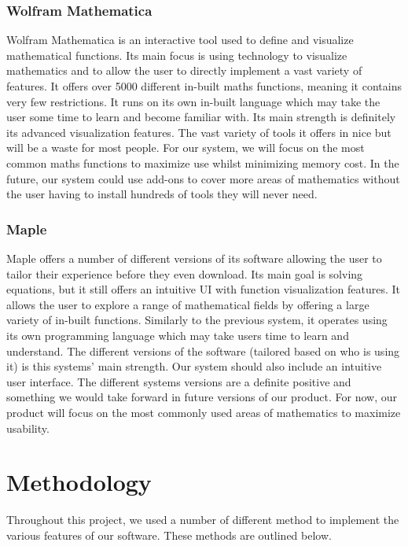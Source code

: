 \documentclass[a4paper, oneside, 11pt]{report}
\begin{document}
\subsection{Wolfram Mathematica\cite{Mathematica}}

Wolfram Mathematica is an interactive tool used to define and visualize mathematical functions. Its main focus is using technology to visualize mathematics and to allow the user to directly implement a vast variety of features. It offers over 5000 different in-built maths functions, meaning it contains very few restrictions. It runs on its own in-built language which may take the user some time to learn and become familiar with. Its main strength is definitely its advanced visualization features.
The vast variety of tools it offers in nice but will be a waste for most people. For our system, we will focus on the most common maths functions to maximize use whilst minimizing memory cost. In the future, our system could use add-ons to cover more areas of mathematics without the user having to install hundreds of tools they will never need.


\subsection{Maple\cite{Maple}}

Maple offers a number of different versions of its software allowing the user to tailor their experience before they even download. Its main goal is solving equations, but it still offers an intuitive UI with function visualization features. It allows the user to explore a range of mathematical fields by offering a large variety of in-built functions. Similarly to the previous system, it operates using its own programming language which may take users time to learn and understand. The different versions of the software (tailored based on who is using it) is this systems' main strength.
Our system should also include an intuitive user interface. The different systems versions are a definite positive and something we would take forward in future versions of our product. For now, our product will focus on the most commonly used areas of mathematics to maximize usability.


\chapter{Methodology}

Throughout this project, we used a number of different method to implement the various features of our software. These methods are outlined below.
\end{document}

